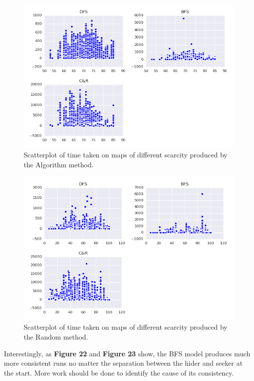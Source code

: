 \documentclass[12pt]{article}
\begin{document}
\begin{figure}[htbp]
\includegraphics[width=1\linewidth]{ScarcityTimeAlg.png} 
\caption{Scatterplot of time taken on maps of different scarcity produced by the Algorithm method.}
\end{figure} 

\begin{figure}[htbp]
\includegraphics[width=1\linewidth]{ScarcityTimeRandom.png} 
\caption{Scatterplot of time taken on maps of different scarcity produced by the Random method.}
\end{figure} 

Interestingly, as \textbf{Figure 22} and \textbf{Figure 23} show, the BFS model produces much more consistent runs no matter the separation between the hider and seeker at the start. More work should be done to identify the cause of its consistency. 
\end{document}
